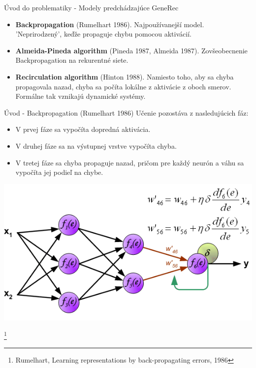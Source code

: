 \documentclass[xcolor=dvipsnames]{beamer}
\begin{document}
\begin{frame}{Úvod do problematiky - Modely predchádzajúce GeneRec}
  \begin{itemize}
    \item \textbf{Backpropagation} (Rumelhart 1986). Najpoužívanejší model. 'Neprirodzený', keďže propaguje chybu pomocou aktivácií. 
    \item \textbf{Almeida-Pineda algorithm} (Pineda 1987, Almeida 1987). Zovšeobecnenie Backpropagation na rekurentné siete.
    \item \textbf{Recirculation algorithm} (Hinton 1988). Namiesto toho, aby sa chyba propagovala nazad, chyba sa počíta lokálne z aktivácie z oboch smerov. Formálne tak vznikajú dynamické systémy. 
  \end{itemize}
\end{frame}

\begin{frame}{Úvod - Backpropagation (Rumelhart 1986)}
Učenie pozostáva z nasledujúcich fáz: 
  \begin{itemize}
    \item V prvej fáze sa vypočíta dopredná aktivácia. 
    \item V druhej fáze sa na výstupnej vrstve vypočíta chyba.
    \item V tretej fáze sa chyba propaguje nazad, pričom pre každý neurón a váhu sa vypočíta jej podieľ na chybe. 
  \end{itemize}
  \begin{center}
    \includegraphics[scale=0.4]{img/bp.png}
  \end{center}
    \footnote{Rumelhart, Learning representations by back-propagating errors, 1986}
\end{frame}
\end{document}
